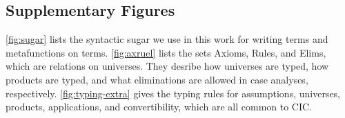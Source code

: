 \documentclass[sigplan,10pt,anonymous,review]{acmart}
\begin{document}
\begin{appendices}
\begin{samepage}
\section{Supplementary Figures}\label{figures}
\FigExtra[!th]
\FloatBarrier
\FigSugar[t]
\FigPTSSets[t]

\autoref{fig:sugar} lists the syntactic sugar we use in this work for writing terms and metafunctions on terms. \autoref{fig:axruel} lists the sets Axioms, Rules, and Elims, which are relations on universes. They desribe how universes are typed, how products are typed, and what eliminations are allowed in case analyses, respectively. \autoref{fig:typing-extra} gives the typing rules for assumptions, universes, products, applications, and convertibility, which are all common to CIC.

\FloatBarrier
\end{samepage}

\begin{comment}
\section{Notes and TODOs}
\begin{itemize}
    \item Instructions for supplementary material:
    \begin{enumerate}
        \item \texttt{sudo apt install opam}
        \item \texttt{opam init \&\& opam switch create ocaml-base-compiler}
        \item \texttt{opam install num ocamlfind}
        \item \texttt{./configure -profile devel}
        \item \texttt{make coqbinaries} or \texttt{make byte}
        \item \texttt{make COQUSERFLAGS="-set 'Sized Typing'" coqlib}
        \item \texttt{bin/coqtop} or \texttt{bin/coqtop.byte}
    \end{enumerate}
    \item Briefly describe changes needed to use linear sized types (this probably means actually reading the paper)
    \item Examples: Classes of programs that don't typecheck; walkthrough of algorithm for one example (need a different sort of semantics to express this usefully...); useful programs that now typecheck and preserve size
    \item Formalize the functions \texttt{compare\_head\_gen\_leq\_with} and \texttt{eqappr} from the Coq kernel for the benefit of explaining $\preceq$. This would probably go in the Appendix.
\end{itemize}
\end{comment}
\end{appendices}
\end{document}
